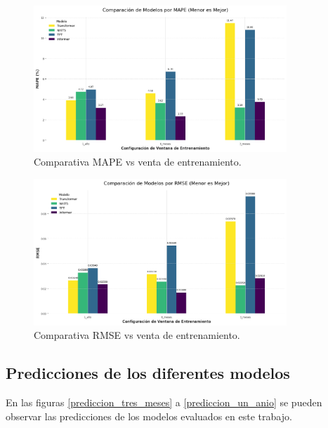 \documentclass[12pt]{article}
\begin{document}
\begin{figure}[H]
\centering
\includegraphics[width=0.85\textwidth]{../results/comparacion_modelos_por_MAPE.png}
\caption{Comparativa MAPE vs venta de entrenamiento.}
\label{mape}
\end{figure}

\begin{figure}[H]
\centering
\includegraphics[width=0.85\textwidth]{../results/comparacion_modelos_por_RMSE.png}
\caption{Comparativa RMSE vs venta de entrenamiento.}
\label{rmse}
\end{figure}


\subsection{Predicciones de los diferentes modelos}

En las figuras \ref{prediccion_tres_meses} a \ref{prediccion_un_anio} se pueden observar las predicciones de los modelos evaluados en este trabajo.
\end{document}

